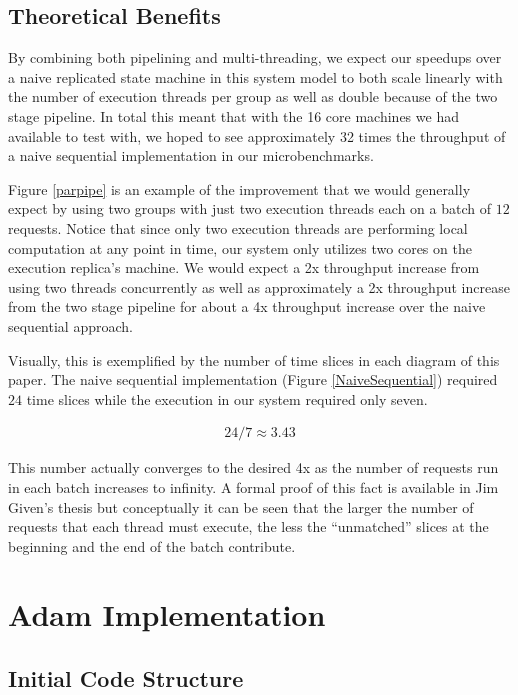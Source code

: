 \documentclass[11pt, oneside]{report}
\begin{document}
\section{Theoretical Benefits}

By combining both pipelining and multi-threading, we expect our speedups over a naive replicated state machine in this system model to both scale linearly with the number of execution threads per group as well as double because of the two stage pipeline. 
In total this meant that with the 16 core machines we had available to test with, we hoped to see approximately 32 times the throughput of a naive sequential implementation in our microbenchmarks. 

Figure \ref{parpipe} is an example of the improvement that we would generally expect by using two groups with just two execution threads each on a batch of $12$ requests.
Notice that since only two execution threads are performing local computation at any point in time, our system only utilizes two cores on the execution replica's machine.
We would expect a 2x throughput increase from using two threads concurrently as well as approximately a 2x throughput increase from the two stage pipeline for about a 4x throughput increase over the naive sequential approach.

Visually, this is exemplified by the number of time slices in each diagram of this paper.
The naive sequential implementation (Figure \ref{NaiveSequential}) required $24$ time slices while the execution in our system required only seven.

\begin{align*}
24 / 7 \approx 3.43
\end{align*}

This number actually converges to the desired 4x as the number of requests run in each batch increases to infinity.
A formal proof of this fact is available in Jim Given's thesis \cite{jim} but conceptually it can be seen that the larger the number of requests that each thread must execute, the less the ``unmatched'' slices at the beginning and the end of the batch contribute. 

\chapter{Adam Implementation}\label{AdamImplementation}

\section{Initial Code Structure}\label{existing}
\end{document}
